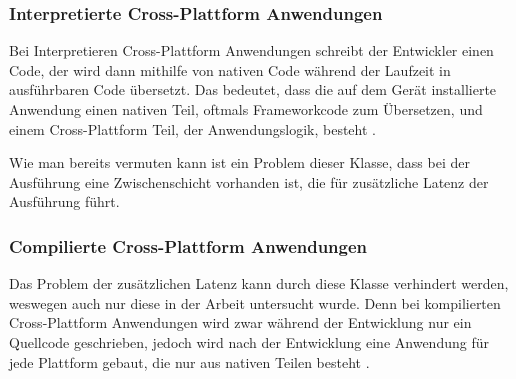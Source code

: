 \subsubsection{Interpretierte Cross-Plattform Anwendungen}
Bei Interpretieren Cross-Plattform Anwendungen schreibt der Entwickler einen Code, der wird dann mithilfe von nativen Code während der Laufzeit in ausführbaren Code übersetzt. Das bedeutet, dass die auf dem Gerät installierte Anwendung einen nativen Teil, oftmals Frameworkcode zum Übersetzen, und einem Cross-Plattform Teil, der Anwendungslogik, besteht \cite{IEEE_development_classes}.

Wie man bereits vermuten kann ist ein Problem dieser Klasse, dass bei der Ausführung eine Zwischenschicht vorhanden ist, die für zusätzliche Latenz der Ausführung führt.

\subsubsection{Compilierte Cross-Plattform Anwendungen}
Das Problem der zusätzlichen Latenz kann durch diese Klasse verhindert werden, weswegen auch nur diese in der Arbeit untersucht wurde. Denn bei kompilierten Cross-Plattform Anwendungen wird zwar während der Entwicklung nur ein Quellcode geschrieben, jedoch wird nach der Entwicklung eine Anwendung für jede Plattform gebaut, die nur aus nativen Teilen besteht \cite{IEEE_development_classes}.
